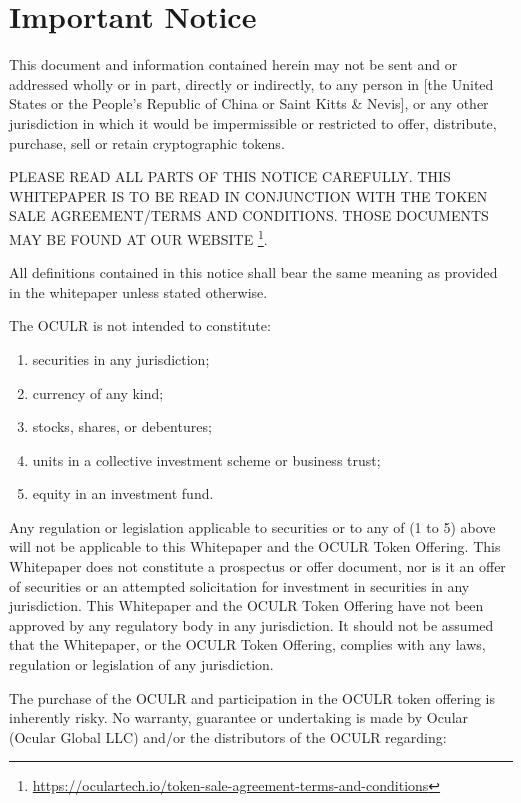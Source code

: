 \documentclass[a4paper]{article}
\begin{document}
\pagebreak

\tableofcontents

\pagebreak

\section{Important Notice}
This document and information contained herein may not be sent and or addressed wholly or in part, directly or indirectly, to any person in [the United States or the People’s Republic of China or Saint Kitts \& Nevis], or any other jurisdiction in which it would be impermissible or restricted to offer, distribute, purchase, sell or retain cryptographic tokens.

PLEASE READ ALL PARTS OF THIS NOTICE CAREFULLY. THIS WHITEPAPER IS TO BE READ IN CONJUNCTION WITH THE TOKEN SALE AGREEMENT/TERMS AND CONDITIONS. THOSE DOCUMENTS MAY BE FOUND AT OUR WEBSITE \footnote{\url{https://oculartech.io/token-sale-agreement-terms-and-conditions}}.

All definitions contained in this notice shall bear the same meaning as provided in the whitepaper unless stated otherwise.

The OCULR is not intended to constitute:
\begin{enumerate}
\item securities in any jurisdiction;
\item currency of any kind;
\item stocks, shares, or debentures;
\item units in a collective investment scheme or business trust;
\item equity in an investment fund.
\end{enumerate}

Any regulation or legislation applicable to securities or to any of (1 to 5) above will not be applicable to this Whitepaper and the OCULR Token Offering. This Whitepaper does not constitute a prospectus or offer document, nor is it an offer of securities or an attempted solicitation for investment in securities in any jurisdiction. This Whitepaper and the OCULR Token Offering have not been approved by any regulatory body in any jurisdiction. It should not be assumed that the Whitepaper, or the OCULR Token Offering, complies with any laws, regulation or legislation of any jurisdiction.

The purchase of the OCULR and participation in the OCULR token offering is inherently risky. No warranty, guarantee or undertaking is made by Ocular (Ocular Global LLC) and/or the distributors of the OCULR regarding:
\end{document}

